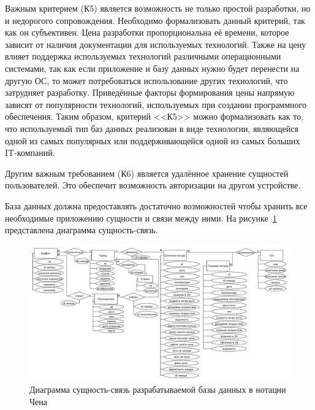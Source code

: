 Важным критерием (К5) является возможность не только простой разработки, но и недорогого сопровождения.
Необходимо формализовать данный критерий, так как он субъективен.
Цена разработки пропорциональна её времени, которое зависит от наличия документации для используемых технологий.
Также на цену влияет поддержка используемых технологий различными операционными системами, так как если приложение и базу данных нужно будет перенести на другую ОС, то может потребоваться использование других технологий, что затрудняет разработку.
Приведённые факторы формирования цены напрямую зависят от популярности технологий, используемых при создании программного обеспечения.
Таким образом, критерий <<К5>> можно формализовать как то, что используемый тип баз данных реализован в виде технологии, являющейся одной из самых популярных или поддерживающейся одной из самых больших IT-компаний.

Другим важным требованием (К6) является удалённое хранение сущностей пользователей.
Это обеспечит возможность авторизации на другом устройстве.

База данных должна предоставлять достаточно возможностей чтобы хранить все необходимые приложению сущности и связи между ними.
На рисунке~\ref{fig:er-chen} представлена диаграмма сущность-связь.
\begin{figure}[H]
	\centering
	\includegraphics[width=\textwidth]{tools/img/er-chen.pdf}
	\caption{
        Диаграмма сущность-связь разрабатываемой базы данных в нотации Чена
    }
	\label{fig:er-chen}
\end{figure}

